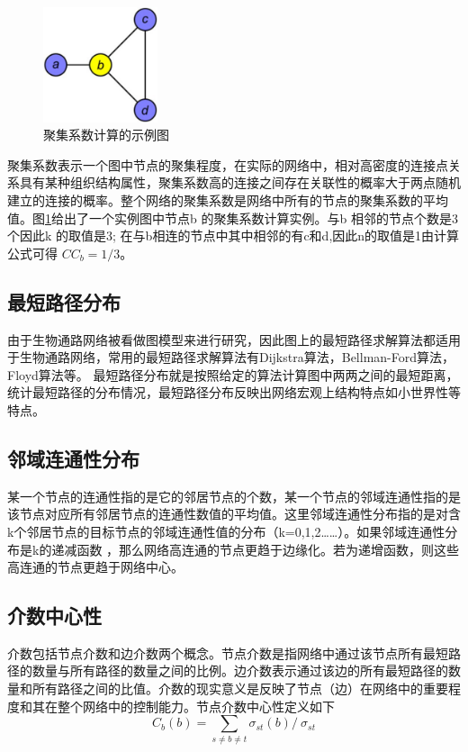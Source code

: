 \begin{figure}[h]
\centering
\includegraphics[width = 0.3\textwidth]{fig22}
\caption[fig24]{聚集系数计算的示例图}
\label{fig24}
\end{figure}

聚集系数表示一个图中节点的聚集程度，在实际的网络中，相对高密度的连接点关系具有某种组织结构属性，聚集系数高的连接之间存在关联性的概率大于两点随机建立的连接的概率。整个网络的聚集系数是网络中所有的节点的聚集系数的平均值。图\ref{fig24}给出了一个实例图中节点b 的聚集系数计算实例。与b 相邻的节点个数是3个因此k 的取值是3; 在与b相连的节点中其中相邻的有c和d,因此n的取值是1由计算公式可得 $CC_{b}=1/3$。


\subsection{最短路径分布}
由于生物通路网络被看做图模型来进行研究，因此图上的最短路径求解算法都适用于生物通路网络，常用的最短路径求解算法有Dijkstra\cite{deng2012fuzzy}算法，Bellman-Ford\cite{goldberg1993heuristic}算法，Floyd\cite{floyd1962algorithm}算法等。
最短路径分布就是按照给定的算法计算图中两两之间的最短距离，统计最短路径的分布情况，最短路径分布反映出网络宏观上结构特点如小世界性等特点\cite{assenov2007computing}。

\subsection{邻域连通性分布}
某一个节点的连通性指的是它的邻居节点的个数，某一个节点的邻域连通性指的是该节点对应所有邻居节点的连通性数值的平均值。这里邻域连通性分布指的是对含k个邻居节点的目标节点的邻域连通性值的分布（k=0,1,2……）。如果邻域连通性分布是k的递减函数 ，那么网络高连通的节点更趋于边缘化。若为递增函数，则这些高连通的节点更趋于网络中心。
\subsection{介数中心性}
介数包括节点介数和边介数两个概念。节点介数是指网络中通过该节点所有最短路径的数量与所有路径的数量之间的比例。边介数表示通过该边的所有最短路径的数量和所有路径之间的比值。介数的现实意义是反映了节点（边）在网络中的重要程度和其在整个网络中的控制能力。节点介数中心性定义如下
\begin{equation}\label{eq26}
	C_{b}( b) =\sum\limits _{s\neq b\neq t} \sigma_{st}( b) /\ \sigma_{st}
\end{equation}

